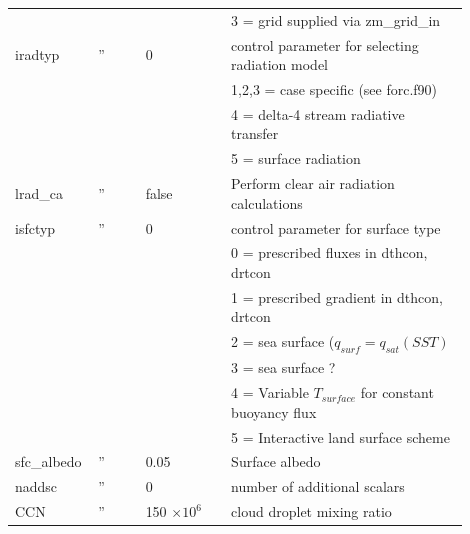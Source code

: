 \documentclass[11pt,a4paper]{article}
\begin{document}
\begin{longtable}[htb]{p{0.12\linewidth}p{0.1\linewidth}p{0.18\linewidth}p{0.5\linewidth}}
             &      &                     & \hspace{2mm} 3 = grid supplied via zm\_grid\_in       \\
iradtyp      &  ''  & 0                   & control parameter for selecting radiation model       \\
             &      &                     & \hspace{2mm} 1,2,3 = case specific (see forc.f90)     \\
             &      &                     & \hspace{2mm} 4     = delta-4 stream radiative transfer\\
             &      &                     & \hspace{2mm} 5     = surface radiation                \\
lrad\_ca     &  ''  & false               & Perform clear air radiation calculations              \\              
isfctyp      &  ''  & 0                   & control parameter for surface type                    \\
             &      &                     & \hspace{2mm} 0 = prescribed fluxes in dthcon, drtcon  \\
             &      &                     & \hspace{2mm} 1 = prescribed gradient in dthcon, drtcon\\
             &      &                     & \hspace{2mm} 2 = sea surface ($q_{surf} = q_{sat}(SST)$ \\
             &      &                     & \hspace{2mm} 3 = sea surface ?                        \\
             &      &                     & \hspace{2mm} 4 = Variable $T_{surface}$ for constant buoyancy flux \\
             &      &                     & \hspace{2mm} 5 = Interactive land surface scheme      \\
sfc\_albedo  &  ''  & 0.05                & Surface albedo                                        \\
naddsc       &  ''  & 0                   & number of additional scalars                          \\
CCN          &  ''  & 150 $\times 10^{6}$ & cloud droplet mixing ratio                            \\

\end{longtable}
\end{document}
